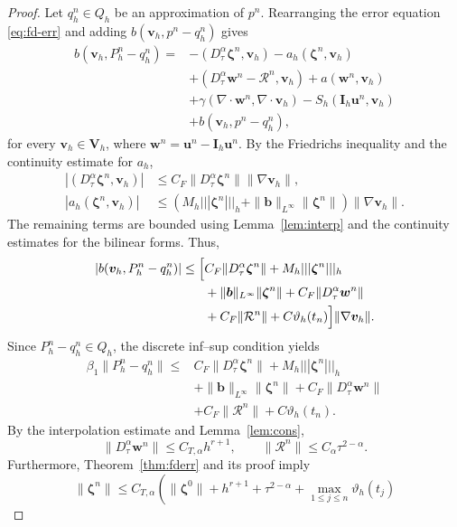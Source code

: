 \documentclass[11pt,a4paper]{article}
\numberwithin{equation}{section}
\theoremstyle{plain}
\theoremstyle{definition}
\theoremstyle{remark}
\newcommand{\nrm}[1]{|||#1|||_h}      %
\newcommand{\Dt}{D_\tau^{\alpha}}     %
\begin{document}
\begin{proof}
Let $q_h^n\in Q_h$ be an approximation of $p^n$.
Rearranging the error equation \eqref{eq:fd-err}
and adding $b(\bm v_h,p^n-q_h^n)$ gives
\[
\begin{aligned}
b(\bm v_h,P_h^n-q_h^n)
={}&
-(\Dt\bm\zeta^n,\bm v_h)
-a_h(\bm\zeta^n,\bm v_h)
\\
&+(\Dt\bm w^n-\mathcal R^n,\bm v_h)
+a(\bm w^n,\bm v_h)
\\
&+\gamma(\nabla\cdot\bm w^n,
         \nabla\cdot\bm v_h)
-S_h(\bm I_h\bm u^n,\bm v_h)
\\
&+b(\bm v_h,p^n-q_h^n),
\end{aligned}
\]
for every $\bm v_h\in\bm V_h$, where
$\bm w^n=\bm u^n-\bm I_h\bm u^n$.
%
By the Friedrichs inequality and the
continuity estimate for $a_h$,
\[
\begin{aligned}
|(\Dt\bm\zeta^n,\bm v_h)|
&\le C_F\|\Dt\bm\zeta^n\|
\|\nabla\bm v_h\|,\\
|a_h(\bm\zeta^n,\bm v_h)|
&\le
\left(
M_h\nrm{\bm\zeta^n}
+\|\bm b\|_{L^\infty}\|\bm\zeta^n\|
\right)
\|\nabla\bm v_h\|.
\end{aligned}
\]
The remaining terms are bounded using
Lemma~\ref{lem:interp} and the continuity
estimates for the bilinear forms. Thus,
\[
\begin{aligned}
|b(\bm v_h,P_h^n-q_h^n)|
\le\Bigl[
&C_F\|\Dt\bm\zeta^n\|
+M_h\nrm{\bm\zeta^n}
\\
&+\|\bm b\|_{L^\infty}\|\bm\zeta^n\|
+C_F\|\Dt\bm w^n\|
\\
&+C_F\|\mathcal R^n\|
+C\vartheta_h(t_n)
\Bigr]\|\nabla\bm v_h\|.
\end{aligned}
\]
Since $P_h^n-q_h^n\in Q_h$, the discrete
inf--sup condition yields
\begin{equation}\label{eq:fd-pressure-intermediate}
\begin{aligned}
\beta_1\|P_h^n-q_h^n\|
\le {}&
C_F\|\Dt\bm\zeta^n\|
+M_h\nrm{\bm\zeta^n}
\\
&+\|\bm b\|_{L^\infty}\|\bm\zeta^n\|
+C_F\|\Dt\bm w^n\|
\\
&+C_F\|\mathcal R^n\|
+C\vartheta_h(t_n).
\end{aligned}
\end{equation}
%
By the interpolation estimate and
Lemma~\ref{lem:cons},
\[
\|\Dt\bm w^n\|
\le C_{T,\alpha}h^{r+1},
\qquad
\|\mathcal R^n\|
\le C_\alpha\tau^{2-\alpha}.
\]
Furthermore, Theorem~\ref{thm:fderr}
and its proof imply
\[
\|\bm\zeta^n\|
\le C_{T,\alpha}
\left(
\|\bm\zeta^0\|
+h^{r+1}
+\tau^{2-\alpha}
+\max_{1\le j\le n}\vartheta_h(t_j)
\]
\end{proof}
\end{document}
